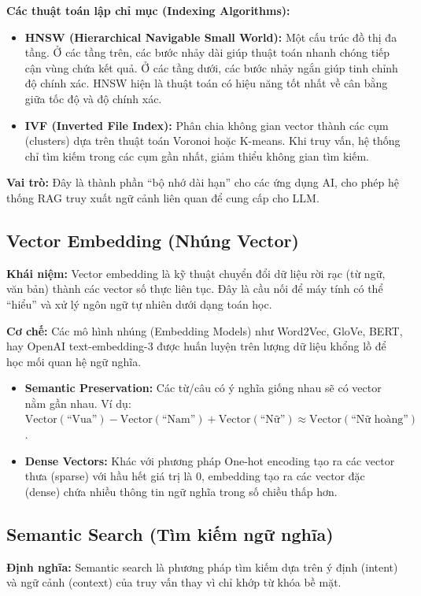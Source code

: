 \documentclass[12pt,a4paper]{report}
\begin{document}
\textbf{Các thuật toán lập chỉ mục (Indexing Algorithms):}
\begin{itemize}
    \item \textbf{HNSW (Hierarchical Navigable Small World):} Một cấu trúc đồ thị đa tầng. Ở các tầng trên, các bước nhảy dài giúp thuật toán nhanh chóng tiếp cận vùng chứa kết quả. Ở các tầng dưới, các bước nhảy ngắn giúp tinh chỉnh độ chính xác. HNSW hiện là thuật toán có hiệu năng tốt nhất về cân bằng giữa tốc độ và độ chính xác.
    \item \textbf{IVF (Inverted File Index):} Phân chia không gian vector thành các cụm (clusters) dựa trên thuật toán Voronoi hoặc K-means. Khi truy vấn, hệ thống chỉ tìm kiếm trong các cụm gần nhất, giảm thiểu không gian tìm kiếm.
\end{itemize}

\textbf{Vai trò:} Đây là thành phần ``bộ nhớ dài hạn'' cho các ứng dụng AI, cho phép hệ thống RAG truy xuất ngữ cảnh liên quan để cung cấp cho LLM.

\subsection{Vector Embedding (Nhúng Vector)}
\textbf{Khái niệm:} Vector embedding là kỹ thuật chuyển đổi dữ liệu rời rạc (từ ngữ, văn bản) thành các vector số thực liên tục. Đây là cầu nối để máy tính có thể ``hiểu'' và xử lý ngôn ngữ tự nhiên dưới dạng toán học.

\textbf{Cơ chế:} Các mô hình nhúng (Embedding Models) như Word2Vec, GloVe, BERT, hay OpenAI text-embedding-3 được huấn luyện trên lượng dữ liệu khổng lồ để học mối quan hệ ngữ nghĩa.
\begin{itemize}
    \item \textbf{Semantic Preservation:} Các từ/câu có ý nghĩa giống nhau sẽ có vector nằm gần nhau. Ví dụ: $\text{Vector}(\text{``Vua''}) - \text{Vector}(\text{``Nam''}) + \text{Vector}(\text{``Nữ''}) \approx \text{Vector}(\text{``Nữ hoàng''})$.
    \item \textbf{Dense Vectors:} Khác với phương pháp One-hot encoding tạo ra các vector thưa (sparse) với hầu hết giá trị là 0, embedding tạo ra các vector đặc (dense) chứa nhiều thông tin ngữ nghĩa trong số chiều thấp hơn.
\end{itemize}

\subsection{Semantic Search (Tìm kiếm ngữ nghĩa)}
\textbf{Định nghĩa:} Semantic search là phương pháp tìm kiếm dựa trên ý định (intent) và ngữ cảnh (context) của truy vấn thay vì chỉ khớp từ khóa bề mặt.
\end{document}
